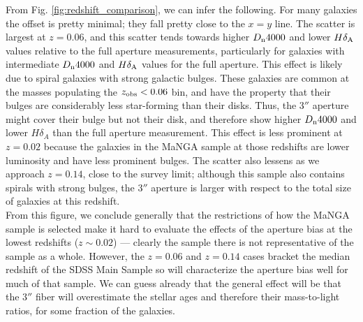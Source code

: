 From Fig. \ref{fig:redshift_comparison}, we can infer the following. For 
many galaxies the offset is pretty minimal; they fall pretty close 
to the $x=y$ line. The scatter is largest at $z = 0.06$, and this scatter
tends towards higher $D_{\rm n}4000$ and lower $H\delta_{\rm A}$ values 
relative to the full aperture measurements, particularly for galaxies with
intermediate $D_{\rm n}4000$ and $H\delta_{\rm A}$ values for the full
aperture. This effect is likely due to spiral galaxies with strong galactic
bulges. These galaxies are common at the masses populating the $z_{\rm obs} < 0.06$
bin, and have the property that their bulges are considerably less star-forming
than their disks. Thus, the 3$''$ aperture might cover their bulge but not their
disk, and therefore show higher $D_{\rm n} 4000$ and lower $H\delta_{A}$
than the full aperture measurement. This effect is less prominent 
at $z=0.02$ because the galaxies in the MaNGA sample at those redshifts 
are lower luminosity and 
have less prominent bulges. The scatter also lessens as we approach $z = 0.14$, 
close to the survey limit; although this sample also contains spirals with
strong bulges,  the 3$''$ aperture is larger with respect to the total size
of galaxies at this redshift.\\

From this figure, we conclude generally that the restrictions of
how the MaNGA sample is selected make it hard to evaluate the effects 
of the aperture bias at the lowest redshifts ($z\sim 0.02$) --- 
clearly the sample there is not representative of the sample as a whole.
However, the $z=0.06$ and $z=0.14$ cases bracket the median redshift of the 
SDSS Main Sample so will characterize the aperture bias well for much
of that sample. We can guess already that the general effect will be that
the $3''$ fiber will overestimate the stellar ages and therefore their 
mass-to-light ratios, for some fraction of the galaxies.


